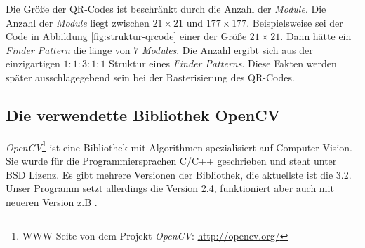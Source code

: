 Die Größe der QR-Codes ist beschränkt durch die Anzahl der \emph{Module}. Die Anzahl der \emph{Module} liegt zwischen $21 \times 21$ und $177 \times 177$. Beispielsweise sei der Code in Abbildung \ref{fig:struktur-qrcode} einer der Größe $21 \times 21$. Dann hätte ein \emph{Finder Pattern} die länge von $7$ \emph{Modules}. Die Anzahl ergibt sich aus der einzigartigen $1:1:3:1:1$ Struktur eines \emph{Finder Patterns}. Diese Fakten werden später ausschlagegebend sein bei der Rasterisierung des QR-Codes.

\subsection{Die verwendette Bibliothek OpenCV}
\emph{OpenCV}\footnote{WWW-Seite von dem Projekt \emph{OpenCV}: \url{http://opencv.org/}} ist eine Bibliothek mit Algorithmen spezialisiert auf \glqq Computer Vision\grqq . Sie wurde für die Programmiersprachen C/C++ geschrieben und steht unter BSD Lizenz. Es gibt mehrere Versionen der Bibliothek, die aktuellste ist die 3.2. Unser Programm setzt allerdings die Version 2.4, funktioniert aber auch mit neueren Version z.B .



